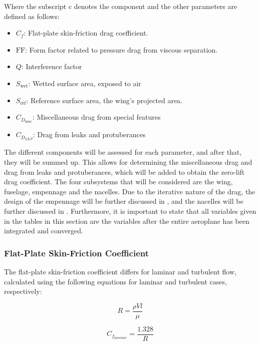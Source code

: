 Where the subscript c denotes the component and the other parameters are defined as follows:

\begin{itemize}
    \item $C_f$: Flat-plate skin-friction drag coefficient.
    \item $\mathrm{FF}$: Form factor related to pressure drag from viscous separation.
    \item $Q$: Interference factor
    \item $S_\text{wet}$: Wetted surface area, exposed to air
    \item $S_\text{ref}$: Reference surface area, the wing’s projected area.
    \item $C_{D_\text{misc}}$: Miscellaneous drag from special features
    \item $C_{D_{L\&P}}$: Drag from leaks and protuberances
\end{itemize}

The different components will be assessed for each parameter, and after that, they will be summed up.
This allows for determining the miscellaneous drag and drag from leaks and protuberances, which will be added to obtain the zero-lift drag coefficient.
The four subsystems that will be considered are the wing, fuselage, empennage and the nacelles.
Due to the iterative nature of the drag, the design of the empennage will be further discussed in , and the nacelles will be further discussed in .
Furthermore, it is important to state that all variables given in the tables in this section are the variables after the entire aeroplane has been integrated and converged.

\subsubsection{Flat-Plate Skin-Friction Coefficient}
The flat-plate skin-friction coefficient differs for laminar and turbulent flow, calculated using the following equations for laminar and turbulent cases, respectively:

\noindent\begin{minipage}[H]{.5\linewidth}
\begin{equation}
    R = \frac{\rho V l}{\mu}
\end{equation}
\end{minipage}%
\begin{minipage}{.5\linewidth}
\begin{equation}
    C_{f_{laminar}} = \frac{1.328}{R}
\end{equation}
\end{minipage}


